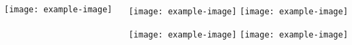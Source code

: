 \documentclass{beamer}
\begin{document}
\begin{frame}
    \begin{columns}[T]
        \begin{column}{.4\textwidth}
            \texttt{[image: example-image]}
        \end{column}
        \begin{column}{.4\textwidth}
            \texttt{[image: example-image]}%
            \texttt{[image: example-image]}

            \texttt{[image: example-image]}%
            \texttt{[image: example-image]}
        \end{column}        
    \end{columns}
\end{frame}
\end{document}

